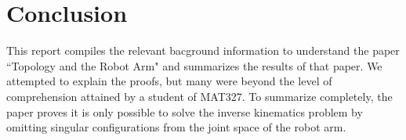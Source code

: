 \documentclass[12pt]{article}
\theoremstyle{definition}
\begin{document}
\section{Conclusion}
This report compiles the relevant bacground information to understand the paper
``Topology and the Robot Arm"
\cite{topology-robot-arm} and summarizes the results of that paper. We attempted
to explain the proofs, but many were beyond the level of comprehension
attained by a student of MAT327. To summarize completely, the paper proves
it is only possible to solve the inverse kinematics problem 
by omitting singular configurations from the joint space of the robot arm.

\printbibliography
\end{document}
